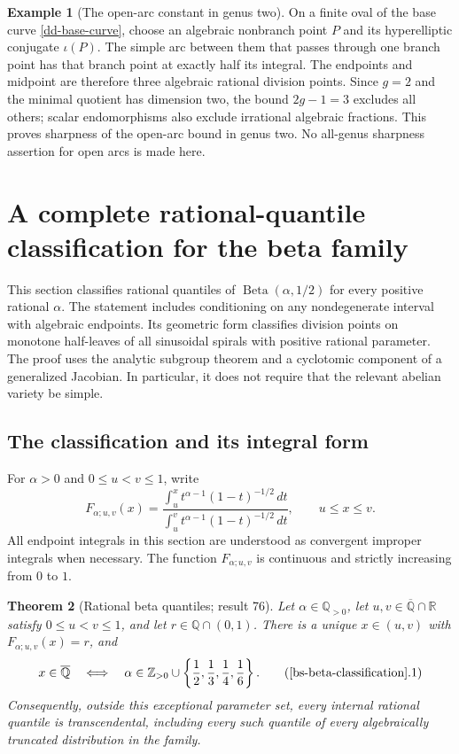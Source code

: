 \documentclass[11pt,a4paper]{article}
\newtheorem{theorem}{Theorem}[section]
\theoremstyle{definition}
\newtheorem{example}[theorem]{Example}
\theoremstyle{remark}
\numberwithin{equation}{section}
\newcommand{\Qbar}{\overline{\mathbb Q}}
\begin{document}
\begin{example}[The open-arc constant in genus two]\label{dd-open-sharp}
On a finite oval of the base curve \eqref{dd-base-curve}, choose an
algebraic nonbranch point $P$ and its hyperelliptic conjugate
$\iota(P)$.  The simple arc between them that passes through one
branch point has that branch point at exactly half its integral.
The endpoints and midpoint are therefore three algebraic rational
division points.  Since $g=2$ and the minimal quotient has dimension
two, the bound $2g-1=3$ excludes all others; scalar endomorphisms
also exclude irrational algebraic fractions.  This proves
sharpness of the open-arc bound in genus two.  No all-genus
sharpness assertion for open arcs is made here.
\end{example}



\section{A complete rational-quantile classification for the beta family}
\label{bs-section}

This section classifies rational quantiles of
$\operatorname{Beta}(\alpha,1/2)$ for every positive rational $\alpha$.
The statement includes conditioning on any nondegenerate interval with
algebraic endpoints.  Its geometric form classifies division points on
monotone half-leaves of all sinusoidal spirals with positive rational
parameter.  The proof uses the analytic subgroup theorem and a cyclotomic
component of a generalized Jacobian.  In particular, it does not require
that the relevant abelian variety be simple.

\subsection{The classification and its integral form}

For $\alpha>0$ and $0\le u<v\le1$, write
\[
 F_{\alpha;u,v}(x)=
 \frac{\displaystyle\int_u^x t^{\alpha-1}(1-t)^{-1/2}\,dt}
      {\displaystyle\int_u^v t^{\alpha-1}(1-t)^{-1/2}\,dt},
 \qquad u\le x\le v.
\]
All endpoint integrals in this section are understood as convergent
improper integrals when necessary.  The function $F_{\alpha;u,v}$ is
continuous and strictly increasing from $0$ to $1$.

\begin{theorem}[Rational beta quantiles; result 76]
\label{bs-beta-classification}
Let $\alpha\in\mathbb Q_{>0}$, let $u,v\in\Qbar\cap\mathbb R$ satisfy
$0\le u<v\le1$, and let $r\in\mathbb Q\cap(0,1)$.
There is a unique $x\in(u,v)$ with $F_{\alpha;u,v}(x)=r$, and
\[
 x\in\Qbar
 \quad\Longleftrightarrow\quad
 \alpha\in\mathbb Z_{>0}\cup
 \left\{\frac12,\frac13,\frac14,\frac16\right\}.
 \tag{\ref{bs-beta-classification}.1}
\]
Consequently, outside this exceptional parameter set, every internal
rational quantile is transcendental, including every such quantile of
every algebraically truncated distribution in the family.
\end{theorem}
\end{document}
